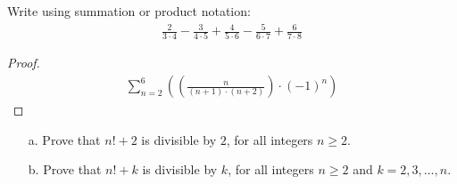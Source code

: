 \documentclass[name=Ojas\ Chaturvedi, emailid=oj.chaturvedi.2024, course=Capstone:\ Discrete\ Math, num=8, deadline={November\ 2,\ 2023}]{homework}
\begin{document}
Write using summation or product notation:
\begin{align*}
    \frac{2}{3 \cdot 4}-\frac{3}{4 \cdot 5}+\frac{4}{5 \cdot 6}-\frac{5}{6 \cdot 7}+\frac{6}{7 \cdot 8}
\end{align*}
\begin{proof}
    \begin{align*}
        \sum_{n=2}^{6} \left ( \left (\frac{n}{(n+1) \cdot (n+2)} \right) \cdot (-1)^{n} \right)
    \end{align*}
\end{proof}

\begin{enumerate}
    \item[a.] Prove that $n!+2$ is divisible by $2$, for all integers $n \geq 2$.
    \item[b.] Prove that $n!+k$ is divisible by $k$, for all integers $n \geq 2$ and $k=2,3, \ldots, n$.
\end{enumerate}
\end{document}
